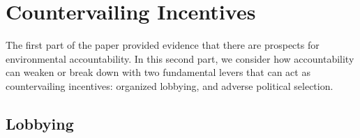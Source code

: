 \documentclass[12pt]{article}
\begin{document}

\section{Countervailing Incentives}

The first part of the paper provided evidence that there are prospects for environmental accountability. In this second part, we consider how accountability can weaken or break down with two fundamental levers that can act as countervailing incentives: organized lobbying, and adverse political selection.

 \subsection{Lobbying\label{ssec:lobbying}}
 
\end{document}
